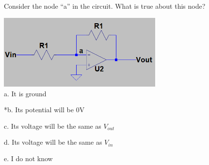 
Consider the node ``a'' in the circuit. What is true about this node?

\includegraphics[width=3.2528in,height=1.48438in]{../../Images/OPampsTransistorsDiodesQ4.png} \\


a. It is ground

*b. Its potential will be 0V

c. Its voltage will be the same as $V_{out}$

d. Its voltage will be the same as $V_{in}$

e. I do not know \\
